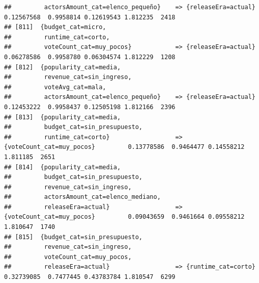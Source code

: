 \documentclass[
]{article}
\begin{document}
\begin{verbatim}
##         actorsAmount_cat=elenco_pequeño}    => {releaseEra=actual}               0.12567568  0.9958814 0.12619543 1.812235  2418
## [811]  {budget_cat=micro,                                                                                                       
##         runtime_cat=corto,                                                                                                      
##         voteCount_cat=muy_pocos}            => {releaseEra=actual}               0.06278586  0.9958780 0.06304574 1.812229  1208
## [812]  {popularity_cat=media,                                                                                                   
##         revenue_cat=sin_ingreso,                                                                                                
##         voteAvg_cat=mala,                                                                                                       
##         actorsAmount_cat=elenco_pequeño}    => {releaseEra=actual}               0.12453222  0.9958437 0.12505198 1.812166  2396
## [813]  {popularity_cat=media,                                                                                                   
##         budget_cat=sin_presupuesto,                                                                                             
##         runtime_cat=corto}                  => {voteCount_cat=muy_pocos}         0.13778586  0.9464477 0.14558212 1.811185  2651
## [814]  {popularity_cat=media,                                                                                                   
##         budget_cat=sin_presupuesto,                                                                                             
##         revenue_cat=sin_ingreso,                                                                                                
##         actorsAmount_cat=elenco_mediano,                                                                                        
##         releaseEra=actual}                  => {voteCount_cat=muy_pocos}         0.09043659  0.9461664 0.09558212 1.810647  1740
## [815]  {budget_cat=sin_presupuesto,                                                                                             
##         revenue_cat=sin_ingreso,                                                                                                
##         voteCount_cat=muy_pocos,                                                                                                
##         releaseEra=actual}                  => {runtime_cat=corto}               0.32739085  0.7477445 0.43783784 1.810547  6299

\end{verbatim}
\end{document}
